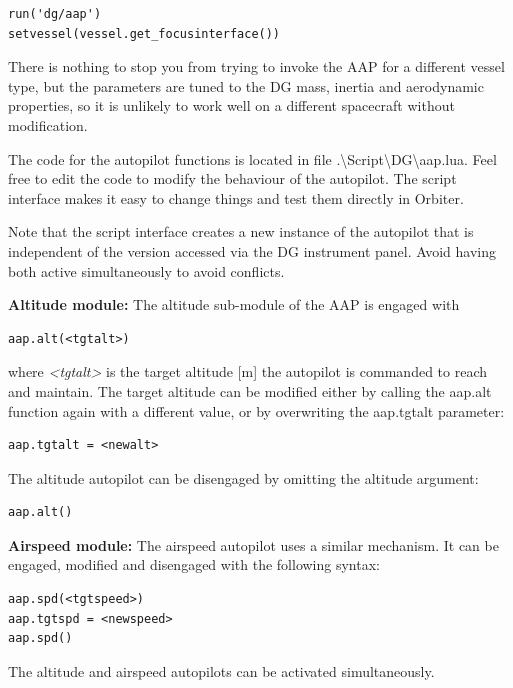 \documentclass[Orbiter User Manual.tex]{subfiles}
\begin{document}
\begin{lstlisting}[language=OSFS]
run('dg/aap')
setvessel(vessel.get_focusinterface())
\end{lstlisting}

There is nothing to stop you from trying to invoke the AAP for a different
vessel type, but the parameters are tuned to the DG mass, inertia and
aerodynamic properties, so it is unlikely to work well on a different spacecraft
without modification.

The code for the autopilot functions is located in file
.\textbackslash Script\textbackslash DG\textbackslash aap.lua. Feel free to edit
the code to modify the behaviour of the autopilot. The script interface makes it
easy to change things and test them directly in Orbiter.

Note that the script interface creates a new instance of the autopilot that is
independent of the version accessed via the DG instrument panel. Avoid having
both active simultaneously to avoid conflicts.

\textbf{Altitude module:}
The altitude sub-module of the AAP is engaged with

\begin{lstlisting}[language=OSFS]
aap.alt(<tgtalt>)
\end{lstlisting}

where \textit{<tgtalt>} is the target altitude [m] the autopilot is commanded to
reach and maintain. The target altitude can be modified either by calling the
aap.alt function again with a different value, or by overwriting the aap.tgtalt
parameter:

\begin{lstlisting}[language=OSFS]
aap.tgtalt = <newalt>
\end{lstlisting}

The altitude autopilot can be disengaged by omitting the altitude argument:

\begin{lstlisting}[language=OSFS]
aap.alt()
\end{lstlisting}

\textbf{Airspeed module:}
The airspeed autopilot uses a similar mechanism. It can be engaged, modified and
disengaged with the following syntax:

\begin{lstlisting}[language=OSFS]
aap.spd(<tgtspeed>)
aap.tgtspd = <newspeed>
aap.spd()
\end{lstlisting}

The altitude and airspeed autopilots can be activated simultaneously.
\end{document}
